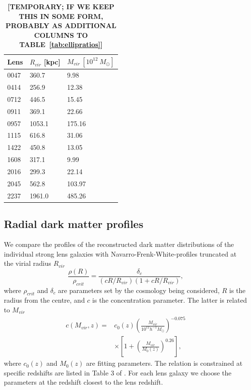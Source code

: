 \documentclass[useAMS,usenatbib]{mn2e}
\begin{document}
\begin{table}
  \begin{center}
    \begin{tabular}{l | l l}
      Lens & $R_{vir}$ [kpc] & $M_{vir} \ [10^{12} \ M_{\odot}]$ \\ \hline
      0047 & 360.7  & 9.98   \\
      0414 & 256.9  & 12.38  \\
      0712 & 446.5  & 15.45  \\
      0911 & 369.1  & 22.66  \\
      0957 & 1053.1 & 175.16 \\
      1115 & 616.8  & 31.06  \\
      1422 & 450.8  & 13.05  \\
      1608 & 317.1  & 9.99   \\
      2016 & 299.3  & 22.14  \\
      2045 & 562.8  & 103.97 \\
      2237 & 1961.0 & 485.26 \\
    \end{tabular}
    \caption[width=\linewidth]{\textbf{[TEMPORARY; IF WE KEEP THIS IN SOME FORM, PROBABLY AS ADDITIONAL COLUMNS TO TABLE~\ref{tab:ellipratios}]}}
    \label{tab:virialmasses}
  \end{center}
\end{table}

\subsection{Radial dark matter profiles}
We compare the profiles of the reconstructed dark matter distributions of the individual strong lens galaxies with Navarro-Frenk-White-profiles \citep[NFW;][]{1996ApJ...462..563N} truncated at the virial radius $R_{vir}$ \citep{2011ApJ...740..102K}
\begin{equation}\label{eq:nfw}
   \frac{\rho(R)}{\rho_{crit}} = \frac{\delta_{c}}{(cR/R_{vir})(1+cR/R_{vir})},
\end{equation}
where $\rho_{crit}$ and $\delta_{c}$ are parameters set by the cosmology being considered, $R$ is the radius from the centre, and $c$ is the concentration parameter. The latter is related to $M_{vir}$ \citep{2011ApJ...740..102K}
\begin{equation}\label{eq:concentration}
 \begin{split}
   c(M_{vir}, z) = & c_{0}(z)\left(\frac{M_{vir}}{10^{12}h^{-1}M_{\odot}}\right)^{-0.075} \\ & \times \left[1+\left(\frac{M_{vir}}{M_{0}(z)}\right)^{0.26}\right],
 \end{split}
\end{equation}
where $c_{0}(z)$ and $M_{0}(z)$ are fitting parameters. The relation is constrained at specific redshifts are listed in Table 3 of \citet{2011ApJ...740..102K}. For each lens galaxy we choose the parameters at the redshift closest to the lens redshift. 
\end{document}
